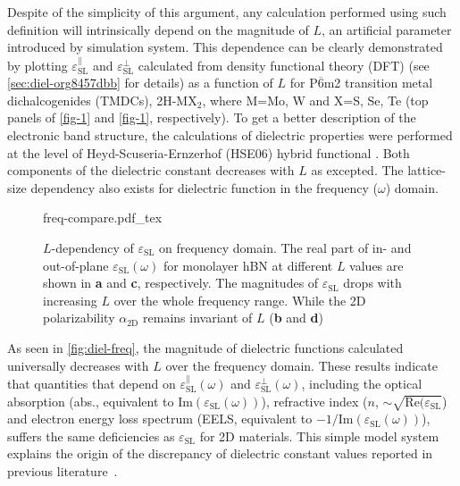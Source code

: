 %
%
Despite of the simplicity of this argument, any calculation performed
using such definition will intrinsically depend on the magnitude of
$L$, an artificial parameter introduced by simulation system. This
dependence can be clearly demonstrated by plotting
$\varepsilon^{\parallel}_{\mathrm{SL}}$ and
$\varepsilon^{\perp}_{\mathrm{SL}}$ calculated from density functional
theory (DFT) (see \autoref{sec:diel-org8457dbb} for details) as a
function of $L$ for P$\overline{6}$m2 transition metal dichalcogenides
(TMDCs), 2H-MX$_{2}$, where M=Mo, W and X=S, Se, Te (top panels of
\autoref{fig-1} and \autoref{fig-1}, respectively). To get
a better description of the electronic band structure, the
calculations of dielectric properties were performed at the level of
Heyd-Scuseria-Ernzerhof (HSE06) hybrid functional
\cite{Heyd_2003_HSe,HSE_2006_erratum}.  Both components of the
dielectric constant decreases with $L$ as excepted.  The lattice-size
dependency also exists for dielectric function in the frequency
($\omega$) domain. 
\begin{figure}[!htbp]
\centering
{freq-compare.pdf_tex}
\caption{\label{fig:diel-freq}
  $L$-dependency of $\varepsilon_{\mathrm{SL}}$ on frequency
  domain. The real part of in- and out-of-plane
  $\varepsilon_{\mathrm{SL}}(\omega)$ for monolayer hBN at different
  $L$ values are shown in \textbf{a} and \textbf{c}, respectively. The
  magnitudes of $\varepsilon_{\mathrm{SL}}$ drops with increasing $L$
  over the whole frequency range. While the 2D polarizability
  $\alpha_{\mathrm{2D}}$ remains invariant of $L$ (\textbf{b} and
  \textbf{d})}
\end{figure}
%
As seen in \autoref{fig:diel-freq}, the magnitude of dielectric
functions calculated universally decreases with $L$ over the frequency
domain.  These results indicate that quantities that depend on
$\varepsilon^{\parallel}_{\mathrm{SL}}(\omega)$ and
$\varepsilon^{\perp}_{\mathrm{SL}}(\omega)$, including the optical
absorption (abs., equivalent to
$\mathrm{Im}(\varepsilon_{\mathrm{SL}}(\omega))$), refractive index
($n$, $\sim{}\sqrt{\mathrm{Re}(\varepsilon_{\mathrm{SL}}}$) and
electron energy loss spectrum (EELS, equivalent to
$-1 / \mathrm{Im}(\varepsilon_{\mathrm{SL}}(\omega))$), suffers the
same deficiencies as $\varepsilon_{\mathrm{SL}}$ for 2D
materials. This simple model system explains the origin of the
discrepancy of dielectric constant values reported in previous
literature~\cite{Li_2016_screening_rev}.
%
%
%
%
%

